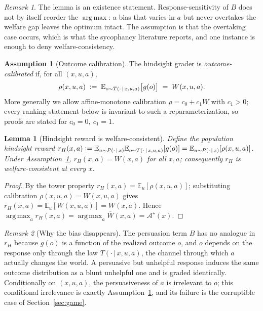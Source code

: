 \documentclass[11pt]{article}
\theoremstyle{plain}
\newtheorem{lemma}{Lemma}
\theoremstyle{definition}
\newtheorem{assumption}{Assumption}
\theoremstyle{remark}
\newtheorem{remark}{Remark}
\newcommand{\E}{\mathbb{E}}
\newcommand{\Ac}{\mathcal{A}}
\newcommand{\Wbar}{\overline{W}}
\newcommand{\given}{\,\vert\,}
\DeclareMathOperator*{\argmax}{arg\,max}
\newcommand{\defeq}{\vcentcolon=}
\begin{document}
\begin{remark}
The lemma is an existence statement. Response-sensitivity of $B$ does not
by itself reorder the $\argmax$: a bias that varies in $a$ but never overtakes the welfare gap
leaves the optimum intact. The assumption is that the overtaking case occurs, which is what the
sycophancy literature reports, and one instance is enough to deny welfare-consistency.
\end{remark}

\begin{assumption}[Outcome calibration]
\label{ass:calib}
The hindsight grader is \emph{outcome-calibrated} if, for all $(x,u,a)$,
\[
  \rho(x,u,a)\;\defeq\;\E_{o\sim T(\cdot\given x,u,a)}\big[g(o)\big]\;=\;W(x,u,a).
\]
More generally we allow affine-monotone calibration $\rho=c_0+c_1 W$ with $c_1>0$; every
ranking statement below is invariant to such a reparameterization, so proofs are stated for
$c_0=0,\ c_1=1$.
\end{assumption}

\begin{lemma}[Hindsight reward is welfare-consistent]
\label{lem:hindsight}
Define the \emph{population hindsight reward}
$r_H(x,a)\defeq\E_{u\sim P(\cdot\given x)}\E_{o\sim T(\cdot\given x,u,a)}[g(o)]
=\E_{u\sim P(\cdot\given x)}[\rho(x,u,a)]$. Under Assumption~\ref{ass:calib},
$r_H(x,a)=\Wbar(x,a)$ for all $x,a$; consequently $r_H$ is welfare-consistent at every $x$.
\end{lemma}

\begin{proof}
By the tower property $r_H(x,a)=\E_u[\rho(x,u,a)]$; substituting calibration
$\rho(x,u,a)=W(x,u,a)$ gives $r_H(x,a)=\E_u[W(x,u,a)]=\Wbar(x,a)$. Hence
$\argmax_a r_H(x,a)=\argmax_a\Wbar(x,a)=\Ac^\star(x)$.
\end{proof}

\begin{remark}[Why the bias disappears]
\label{rem:nobias}
The persuasion term $B$ has no analogue in $r_H$ because $g(o)$ is a function of the realized
outcome $o$, and $o$ depends on the response only through the law $T(\cdot\given x,u,a)$, the
channel through which $a$ actually changes the world. A persuasive but unhelpful response
induces the same outcome distribution as a blunt unhelpful one and is graded identically.
Conditionally on $(x,u,a)$, the persuasiveness of $a$ is irrelevant to $o$; this conditional
irrelevance is exactly Assumption~\ref{ass:calib}, and its failure is the corruptible case of
Section~\ref{sec:game}.
\end{remark}
\end{document}
